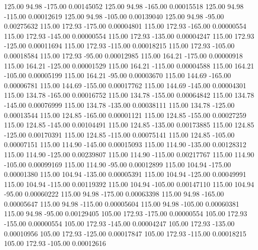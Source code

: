     125.00     94.98   -175.00     0.00145052
    125.00     94.98   -165.00     0.00015518
    125.00     94.98   -115.00     0.00012619
    125.00     94.98   -105.00     0.00139040
    125.00     94.98    -95.00     0.00275632
    115.00    172.93   -175.00     0.00004801
    115.00    172.93   -165.00     0.00000554
    115.00    172.93   -145.00     0.00000554
    115.00    172.93   -135.00     0.00004247
    115.00    172.93   -125.00     0.00011694
    115.00    172.93   -115.00     0.00018215
    115.00    172.93   -105.00     0.00018584
    115.00    172.93    -95.00     0.00012985
    115.00    164.21   -175.00     0.00000918
    115.00    164.21   -125.00     0.00001529
    115.00    164.21   -115.00     0.00004588
    115.00    164.21   -105.00     0.00005199
    115.00    164.21    -95.00     0.00003670
    115.00    144.69   -165.00     0.00006781
    115.00    144.69   -155.00     0.00017762
    115.00    144.69   -145.00     0.00004301
    115.00    134.78   -165.00     0.00016752
    115.00    134.78   -155.00     0.00064842
    115.00    134.78   -145.00     0.00076999
    115.00    134.78   -135.00     0.00038111
    115.00    134.78   -125.00     0.00013544
    115.00    124.85   -165.00     0.00001121
    115.00    124.85   -155.00     0.00027259
    115.00    124.85   -145.00     0.00104491
    115.00    124.85   -135.00     0.00173885
    115.00    124.85   -125.00     0.00170391
    115.00    124.85   -115.00     0.00075141
    115.00    124.85   -105.00     0.00007151
    115.00    114.90   -145.00     0.00015093
    115.00    114.90   -135.00     0.00128312
    115.00    114.90   -125.00     0.00239807
    115.00    114.90   -115.00     0.00217767
    115.00    114.90   -105.00     0.00099169
    115.00    114.90    -95.00     0.00012899
    115.00    104.94   -175.00     0.00001380
    115.00    104.94   -135.00     0.00005391
    115.00    104.94   -125.00     0.00049991
    115.00    104.94   -115.00     0.00119392
    115.00    104.94   -105.00     0.00147110
    115.00    104.94    -95.00     0.00060222
    115.00     94.98   -175.00     0.00063398
    115.00     94.98   -165.00     0.00005647
    115.00     94.98   -115.00     0.00005604
    115.00     94.98   -105.00     0.00060381
    115.00     94.98    -95.00     0.00129405
    105.00    172.93   -175.00     0.00000554
    105.00    172.93   -155.00     0.00000554
    105.00    172.93   -145.00     0.00004247
    105.00    172.93   -135.00     0.00010956
    105.00    172.93   -125.00     0.00017847
    105.00    172.93   -115.00     0.00018215
    105.00    172.93   -105.00     0.00012616
